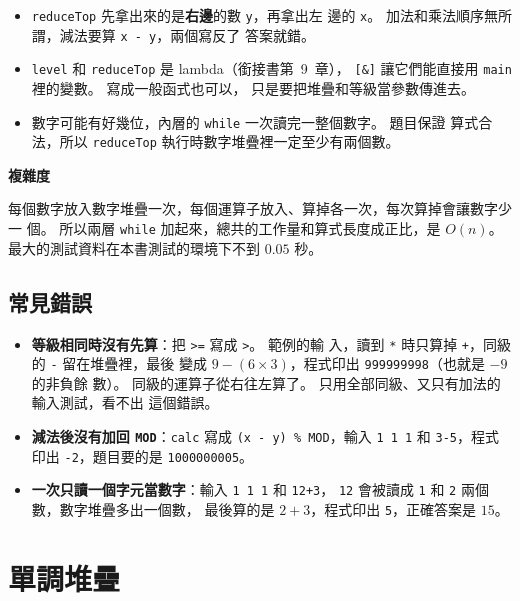 
\begin{itemize}
\item \texttt{reduceTop} 先拿出來的是\textbf{右邊}的數 \texttt{y}，再拿出左
邊的 \texttt{x}。 加法和乘法順序無所謂，減法要算 \texttt{x - y}，兩個寫反了
答案就錯。
\item \texttt{level} 和 \texttt{reduceTop} 是 lambda（銜接書第~9~章），
\texttt{[\&]} 讓它們能直接用 \texttt{main} 裡的變數。 寫成一般函式也可以，
只是要把堆疊和等級當參數傳進去。
\item 數字可能有好幾位，內層的 \texttt{while} 一次讀完一整個數字。 題目保證
算式合法，所以 \texttt{reduceTop} 執行時數字堆疊裡一定至少有兩個數。
\end{itemize}

\textbf{複雜度}

每個數字放入數字堆疊一次，每個運算子放入、算掉各一次，每次算掉會讓數字少一
個。 所以兩層 \texttt{while} 加起來，總共的工作量和算式長度成正比，是
$O(n)$。 最大的測試資料在本書測試的環境下不到 $0.05$ 秒。

\subsection{常見錯誤}

\begin{itemize}
\item \textbf{等級相同時沒有先算}：把 \texttt{>=} 寫成 \texttt{>}。 範例的輸
入，讀到 \texttt{*} 時只算掉 \texttt{+}，同級的 \texttt{-} 留在堆疊裡，最後
變成 $9 - (6 \times 3)$，程式印出 \texttt{999999998}（也就是 $-9$ 的非負餘
數）。 同級的運算子從右往左算了。 只用全部同級、又只有加法的輸入測試，看不出
這個錯誤。
\item \textbf{減法後沒有加回 \texttt{MOD}}：\texttt{calc} 寫成
\texttt{(x - y) \% MOD}，輸入 \texttt{1 1 1} 和 \texttt{3-5}，程式印出
\texttt{-2}，題目要的是 \texttt{1000000005}。
\item \textbf{一次只讀一個字元當數字}：輸入 \texttt{1 1 1} 和 \texttt{12+3}，
\texttt{12} 會被讀成 \texttt{1} 和 \texttt{2} 兩個數，數字堆疊多出一個數，
最後算的是 $2 + 3$，程式印出 \texttt{5}，正確答案是 $15$。
\end{itemize}

\section{單調堆疊}
\label{sec:mono-stack}

